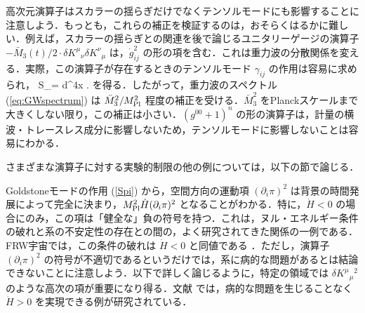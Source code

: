 高次元演算子はスカラーの揺らぎだけでなくテンソルモードにも影響することに注意しよう．もっとも，これらの補正を検証するのは，おそらくはるかに難しい．例えば，スカラーの揺らぎとの関連を後で論じるユニタリーゲージの演算子 $-\bar M_3(t)/2  \cdot \delta K^\mu {}_\nu \delta
K^\nu {}_\mu $ は，$\dot g_{ij}^2$ の形の項を含む．これは重力波の分散関係を変える．実際，この演算子が存在するときのテンソルモード $\gamma_{ij}$ の作用は容易に求められ，
\be
S_{\gamma}= \int d^4x   \;.
\ee
を得る．したがって，重力波のスペクトル (\ref{eq:GWspectrum}) は $\bar M_3^2/M_{\rm Pl}^2$ 程度の補正を受ける．$\bar M_3^2$ をPlanckスケールまで大きくしない限り，この補正は小さい．$(g^{00}+1)^{n}$ の形の演算子は，計量の横波・トレースレス成分に影響しないため，テンソルモードに影響しないことは容易にわかる．

さまざまな演算子に対する実験的制限の他の例については，以下の節で論じる．


Goldstoneモードの作用 (\ref{Spi}) から，空間方向の運動項 $(\partial_i \pi)^2$ は背景の時間発展によって完全に決まり，$M_{\rm Pl}^2 \dot H (\partial_i\pi)^2$ となることがわかる．特に，$\dot H <0$ の場合にのみ，この項は「健全な」負の符号を持つ．これは，ヌル・エネルギー条件の破れと系の不安定性の存在との間の，よく研究されてきた関係の一例である．FRW宇宙では，この条件の破れは $\dot H<0$ と同値である \cite{Hsu:2004vr,Dubovsky:2005xd}．ただし，演算子 $(\partial_i \pi)^2$ の符号が不適切であるというだけでは，系に病的な問題があるとは結論できないことに注意しよう．以下で詳しく論じるように，特定の領域では $\delta K^\mu {}_\mu {}^2$ のような高次の項が重要になり得る．文献 \cite{Creminelli:2006xe} では，病的な問題を生じることなく $\dot H >0$ を実現できる例が研究されている．

